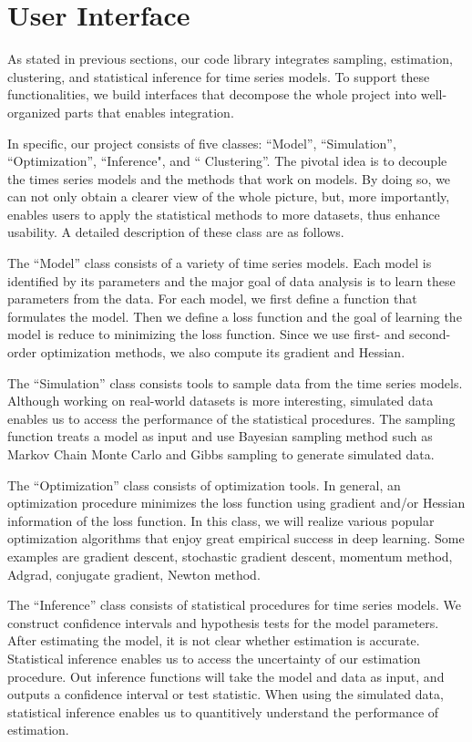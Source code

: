 
\section{User Interface}

As stated in previous sections, our code library integrates sampling, estimation, clustering, and statistical inference for time series models. To support these functionalities, we build interfaces that decompose the whole project into well-organized parts that enables integration.

In specific, our project consists of five classes: ``Model'', ``Simulation'', ``Optimization'', ``Inference", and `` Clustering''. The pivotal idea is to  decouple the times series models and the methods that work on models. By doing so, we can not only obtain  a  clearer view of the whole picture, but, more importantly, enables users to  apply the statistical methods to more datasets, thus enhance  usability. A detailed description of these class are as follows.


The ``Model'' class consists of a variety of  time series models. Each model is identified by its  parameters and the major goal of data analysis is to learn these parameters from the data. For each model, we first define a  function that formulates the model. Then we define a loss function and the goal of learning the model is reduce to minimizing the loss function. Since we use first- and second-order optimization methods, we also compute its gradient and Hessian.

The ``Simulation'' class consists tools to sample data from the time series models. Although working on real-world datasets is more interesting, simulated data enables us to access the performance of the statistical procedures. The sampling function treats a model as input and use Bayesian sampling method such as Markov Chain Monte Carlo  and Gibbs sampling to generate simulated data.

The ``Optimization'' class consists of optimization tools. In general, an optimization procedure minimizes the loss function using gradient and/or Hessian information of the loss function. In this class, we will realize various popular optimization algorithms that enjoy great empirical success in deep learning. Some examples are gradient descent, stochastic gradient descent, momentum method, Adgrad, conjugate gradient, Newton method.

The ``Inference'' class consists of statistical procedures for time series models. We construct confidence intervals and hypothesis tests for the model parameters. After estimating the model, it is not clear whether estimation is accurate. Statistical inference enables us to access the uncertainty of our estimation procedure. Out inference functions will take the model and data as input, and outputs a confidence interval or test statistic. When using the simulated data, statistical inference enables us to quantitively understand the performance of estimation.


